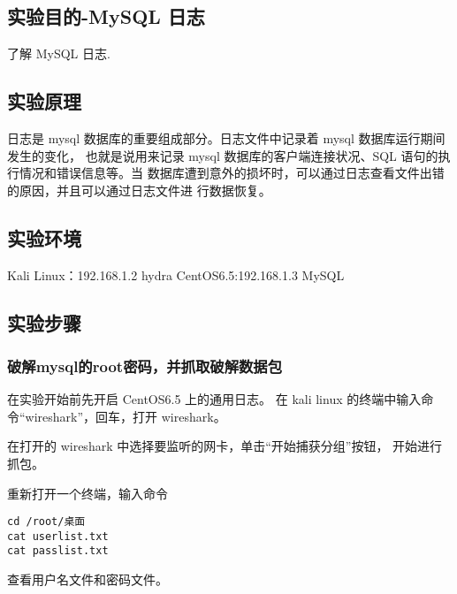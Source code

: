 \subsection{实验目的-MySQL 日志}
了解 MySQL 日志.
%
\subsection{实验原理}
日志是 mysql 数据库的重要组成部分。日志文件中记录着 mysql 数据库运行期间发生的变化，
也就是说用来记录 mysql 数据库的客户端连接状况、SQL 语句的执行情况和错误信息等。当
数据库遭到意外的损坏时，可以通过日志查看文件出错的原因，并且可以通过日志文件进
行数据恢复。
%
\subsection{实验环境}
Kali Linux：192.168.1.2 hydra
CentOS6.5:192.168.1.3 MySQL
%
\subsection{实验步骤}
\subsubsection{破解mysql的root密码，并抓取破解数据包}
在实验开始前先开启 CentOS6.5 上的通用日志。
在 kali linux 的终端中输入命令``wireshark''，回车，打开 wireshark。

在打开的 wireshark 中选择要监听的网卡，单击``开始捕获分组''按钮，
开始进行抓包。

重新打开一个终端，输入命令
\begin{verbatim}
cd /root/桌面
cat userlist.txt
cat passlist.txt
\end{verbatim}
查看用户名文件和密码文件。

